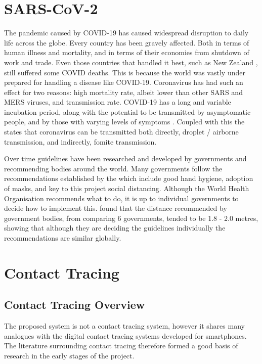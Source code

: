 \documentclass{l4proj}
\begin{document}
\section{SARS-CoV-2}

The pandemic caused by COVID-19 has caused widespread disruption to daily life across the globe. Every country has been gravely affected. Both in terms of human illness and mortality, and in terms of their economies from shutdown of work and trade. Even those countries that handled it best, such as New Zealand \citep{robert_lessons_2020}, still suffered some COVID deaths. This is because the world was vastly under prepared for handling a disease like COVID-19. Coronavirus has had such an effect for two reasons: high mortality rate, albeit lower than other SARS and MERS viruses, and transmission rate. COVID-19 has a long and variable incubation period, along with the potential to be transmitted by asymptomatic people, and by those with varying levels of symptoms \citep{vannabouathong_novel_2020}. Coupled with this the \citet{world_health_organisation_transmission_2020} states that coronavirus can be transmitted both directly, droplet / airborne transmission, and indirectly, fomite transmission.

Over time guidelines have been researched and developed by governments and recommending bodies around the world. Many governments follow the recommendations established by the \cite{world_health_organization_responding_2020} which include good hand hygiene, adoption of masks, and key to this project social distancing. Although the World Health Organisation recommends what to do, it is up to individual governments to decide how to implement this.\citet{yoo_comparative_2020} found that the distance recommended by government bodies, from comparing 6 governments, tended to be 1.8 - 2.0 metres, showing that although they are deciding the guidelines individually the recommendations are similar globally.

\section{Contact Tracing}

\subsection{Contact Tracing Overview}

The proposed system is not a contact tracing system, however it shares many analogues with the digital contact tracing systems developed for smartphones. The literature surrounding contact tracing therefore formed a good basis of research in the early stages of the project.
\end{document}
